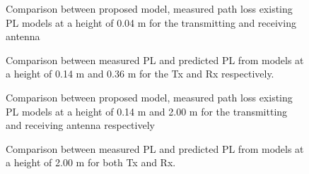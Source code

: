 \begin{figure}[H]
\centering

\caption{Comparison between proposed model, measured path loss existing PL models at a height of 0.04 m for the transmitting and receiving antenna}
\label{ourModel1}
\end{figure}

\begin{figure}[H]
\centering

\caption{Comparison between measured PL and predicted PL from models at a height of 0.14 m and 0.36 m for the Tx and Rx respectively.}
\label{Models62}
\end{figure}

\begin{figure}[H]
\centering

\caption{Comparison between proposed model, measured path loss existing PL models at a height of 0.14 m and 2.00 m for the transmitting and receiving antenna respectively}
\label{ourModel2}
\end{figure}

\begin{figure}[H]
\centering

\caption{Comparison between measured PL and predicted PL from models at a height of 2.00 m for both Tx and Rx.}
\label{Models102}
\end{figure}






     
